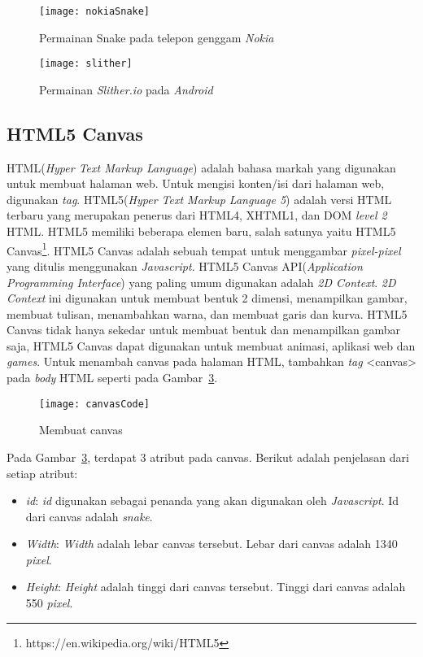 \begin{figure}[H]
	\centering  
	\texttt{[image: nokiaSnake]}  
	\caption[Permainan Snake pada telepon genggam \textit{Nokia}]{Permainan Snake pada telepon genggam \textit{Nokia}} 
	\label{fig:nokiaSnake} 
\end{figure} 

\begin{figure}[H]
	\centering  
	\texttt{[image: slither]}  
	\caption[Permainan \textit{Slither.io} pada \textit{Android}]{Permainan \textit{Slither.io} pada \textit{Android}} 
	\label{fig:slither} 
\end{figure} 

\subsection{HTML5 Canvas}
HTML(\textit{Hyper Text Markup Language}) adalah bahasa markah yang digunakan untuk membuat halaman web. Untuk mengisi konten/isi dari halaman web, digunakan \textit{tag}. HTML5(\textit{Hyper Text Markup Language 5}) adalah versi HTML terbaru yang merupakan penerus dari HTML4, XHTML1, dan DOM \textit{level 2} HTML. HTML5 memiliki beberapa elemen baru, salah satunya yaitu HTML5 Canvas\footnote{https://en.wikipedia.org/wiki/HTML5}. HTML5 Canvas adalah sebuah tempat untuk menggambar \textit{pixel-pixel} yang ditulis menggunakan \textit{Javascript}. HTML5 Canvas API(\textit{Application Programming Interface}) yang paling umum digunakan adalah \textit{2D Context}. \textit{2D Context} ini digunakan untuk membuat bentuk 2 dimensi, menampilkan gambar, membuat tulisan, menambahkan warna, dan membuat garis dan kurva. HTML5 Canvas tidak hanya sekedar untuk membuat bentuk dan menampilkan gambar saja, HTML5 Canvas dapat digunakan untuk membuat animasi, aplikasi web dan \textit{games}. Untuk menambah canvas pada halaman HTML, tambahkan \textit{tag} <canvas> pada \textit{body} HTML seperti pada Gambar~\ref{fig:canvasCode}.

\begin{figure}[H]
	\centering  
	\texttt{[image: canvasCode]}  
	\caption[Membuat canvas]{Membuat canvas} 
	\label{fig:canvasCode} 
\end{figure} 

Pada Gambar~\ref{fig:canvasCode}, terdapat 3 atribut pada canvas. Berikut adalah penjelasan dari setiap atribut: 
\begin{itemize}
	\item \textit{id}: \textit{id} digunakan sebagai penanda yang akan digunakan oleh \textit{Javascript}. Id dari canvas adalah \textit{snake}.
	\item \textit{Width}: \textit{Width} adalah lebar canvas tersebut. Lebar dari canvas adalah 1340 \textit{pixel}.
	\item \textit{Height}: \textit{Height} adalah tinggi dari canvas tersebut. Tinggi dari canvas adalah 550 \textit{pixel}.
\end{itemize}


